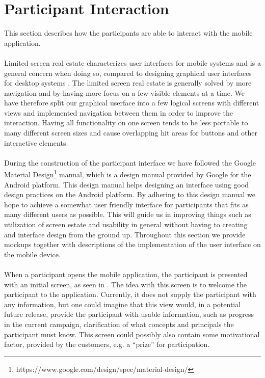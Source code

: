 
\section{Participant Interaction}
\label{sec:participant_interaction}

This section describes how the participants are able to interact with the mobile application. 
\\\\
Limited screen real estate characterizes user interfaces for mobile systems and is a general concern when doing so, compared to designing graphical user interfaces for desktop systems \parencite[cha. 21]{mobile_computing_constraints}. The limited screen real estate is generally solved by more navigation and by having more focus on a few visible elements at a time. We have therefore split our graphical userface into a few logical screens with different views and implemented navigation between them in order to improve the interaction. Having all functionality on one screen tends to be less portable to many different screen sizes and cause overlapping hit areas for buttons and other interactive elements.
\\\\
During the construction of the participant interface we have followed the Google Material Design\footnote{https://www.google.com/design/spec/material-design/} manual, which is a design manual provided by Google for the Android platform. This design manual helps designing an interface using good design practices on the Android platform. By adhering to this design manual we hope to achieve a somewhat user friendly interface for participants that fits as many different users as possible. This will guide us in improving things such as utilization of screen estate and usability in general without having to creating and interface design from the ground up. Throughout this section we provide mockups together with descriptions of the implementation of the user interface on the mobile device.
\\\\
When a participant opens the mobile application, the participant is presented with an initial screen, as seen in . The idea with this screen is to welcome the participant to the application. Currently, it does not supply the participant with any information, but one could imagine that this view would, in a potential future release, provide the participant with usable information, such as progress in the current campaign, clarification of what concepts and principals the participant must know. This screen could possibly also contain some motivational factor, provided by the customers, e.g. a ``prize'' for participation.

